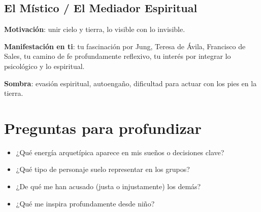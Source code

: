 \documentclass[12pt]{article}
\begin{document}
\subsection*{ El Místico / El Mediador Espiritual}
\textbf{Motivación}: unir cielo y tierra, lo visible con lo invisible.

\textbf{Manifestación en ti}: tu fascinación por Jung, Teresa de Ávila, Francisco de Sales, tu camino de fe profundamente reflexivo, tu interés por integrar lo psicológico y lo espiritual.

\textbf{Sombra}: evasión espiritual, autoengaño, dificultad para actuar con los pies en la tierra.

\section*{Preguntas para profundizar}
\begin{itemize}
  \item ¿Qué energía arquetípica aparece en mis sueños o decisiones clave?
  \item ¿Qué tipo de personaje suelo representar en los grupos?
  \item ¿De qué me han acusado (justa o injustamente) los demás?
  \item ¿Qué me inspira profundamente desde niño?
\end{itemize}
\end{document}
